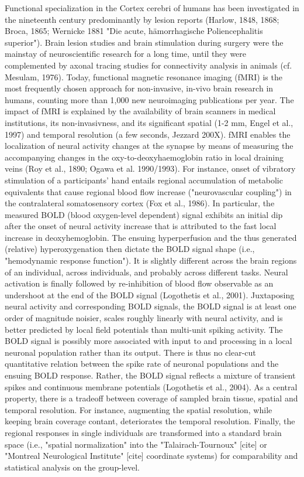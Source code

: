 \documentclass[authoryear,review,3p]{elsarticle}
\begin{document}
Functional specialization in the Cortex cerebri of humans has been
investigated in the nineteenth
century predominantly by lesion reports
(Harlow, 1848, 1868; Broca, 1865;
Wernicke 1881 "Die acute, hämorrhagische Poliencephalitis superior").
Brain lesion studies and brain stimulation during surgery were the mainstay of
neuroscientific research for a long time,
until they were complemented by
axonal tracing studies for connectivity analysis in
animals (cf. Mesulam, 1976).
%
Today, functional magnetic resonance imaging (fMRI)
is the most frequently chosen approach for non-invasive,
in-vivo brain research in humans,
counting more than 1,000 new neuroimaging publications per year.
The impact of fMRI is explained by the availability
of brain scanners in medical institutions,
its non-invasivness,
and its significant spatial (1-2 mm, Engel et al., 1997)
and temporal resolution (a few seconds, Jezzard 200X).
%
fMRI enables the localization of neural activity changes at the synapse by
means of measuring the accompanying changes in
the oxy-to-deoxyhaemoglobin ratio in local draining veins
(Roy et al., 1890; Ogawa et al. 1990/1993).
For instance, onset of vibratory stimulation of a participants' hand
entails regional accumulation of metabolic equivalents that cause
regional blood flow increase ("neurovascular coupling") in the
contralateral somatosensory cortex (Fox et al., 1986).
%
In particular,
the measured BOLD (blood oxygen-level dependent) signal exhibits
an initial dip after the onset of neural activity
increase that is attributed to the fast local increase
in deoxyhemoglobin.
The ensuing hyperperfusion and the
thus generated (relative) hyperoxygenation then dictate
the BOLD signal shape (i.e., "hemodynamic response function").
It is slightly different across the brain regions of an individual,
across individuals, and probably across different tasks.
Neural activation is finally followed by re-inhibition of
blood flow observable as an undershoot at the
end of the BOLD signal (Logothetis et al., 2001).
%
Juxtaposing neural activity and corresponding BOLD signals,
the BOLD signal is at least one order of magnitude noisier,
scales roughly linearly with neural activity, and
is better predicted by local field potentials than
multi-unit spiking activity. The BOLD signal is possibly more associated
with input to and processing in a local neuronal population
rather than its output. There is thus no clear-cut quantitative relation
between the spike rate of neuronal populations and the ensuing
BOLD response. Rather, the BOLD signal reflects a mixture of
transient spikes and continuous membrane potentials (Logothetis et al., 2004).
%
As a central property, there is a tradeoff between
coverage of sampled brain tissue, spatial and temporal resolution. 
For instance, augmenting the spatial resolution, while keeping
brain coverage contant, deteriorates the temporal resolution.
%
Finally,
the regional responses in single individuals are transformed
into a standard brain space
(i.e., "spatial normalization" into the
"Talairach-Tournoux" [cite] or
"Montreal Neurological Institute" [cite]
coordinate systems)
for comparability and statistical analysis on the group-level.
\end{document}
